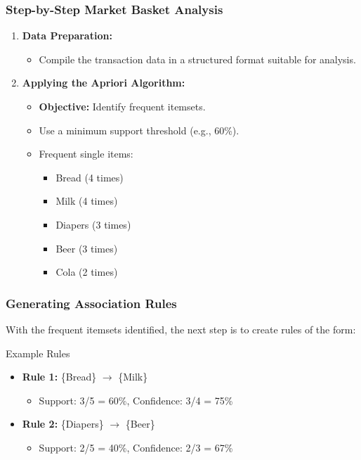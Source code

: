 \documentclass{beamer}
\begin{document}
\begin{frame}[fragile]
    \frametitle{Step-by-Step Market Basket Analysis}
    \begin{enumerate}
        \item \textbf{Data Preparation:}
        \begin{itemize}
            \item Compile the transaction data in a structured format suitable for analysis.
        \end{itemize}
        
        \item \textbf{Applying the Apriori Algorithm:}
        \begin{itemize}
            \item \textbf{Objective:} Identify frequent itemsets.
            \item Use a minimum support threshold (e.g., 60\%).
            \item Frequent single items: 
            \begin{itemize}
                \item Bread (4 times)
                \item Milk (4 times)
                \item Diapers (3 times)
                \item Beer (3 times)
                \item Cola (2 times)
            \end{itemize}
        \end{itemize}
    \end{enumerate}
\end{frame}

\begin{frame}[fragile]
    \frametitle{Generating Association Rules}
    With the frequent itemsets identified, the next step is to create rules of the form:
    
    \begin{block}{Example Rules}
        \begin{itemize}
            \item \textbf{Rule 1:} \{Bread\} $\rightarrow$ \{Milk\}
            \begin{itemize}
                \item Support: 3/5 = 60\%, Confidence: 3/4 = 75\%
            \end{itemize}
            \item \textbf{Rule 2:} \{Diapers\} $\rightarrow$ \{Beer\}
            \begin{itemize}
                \item Support: 2/5 = 40\%, Confidence: 2/3 = 67\%
            \end{itemize}
        \end{itemize}
    \end{block}
\end{frame}
\end{document}

